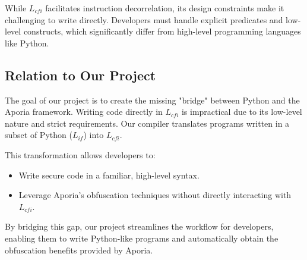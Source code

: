 While $L_{cfi}$ facilitates instruction decorrelation, its design constraints make it challenging to write directly. Developers must handle explicit predicates and low-level constructs, which significantly differ from high-level programming languages like Python.

\subsection{Relation to Our Project}
The goal of our project is to create the missing "bridge" between Python and the Aporia framework. Writing code directly in $L_{cfi}$ is impractical due to its low-level nature and strict requirements. Our compiler translates programs written in a subset of Python ($L_{if}$) into $L_{cfi}$. 

This transformation allows developers to:
\begin{itemize}
    \item Write secure code in a familiar, high-level syntax.
    \item Leverage Aporia’s obfuscation techniques without directly interacting with $L_{cfi}$.
\end{itemize}

By bridging this gap, our project streamlines the workflow for developers, enabling them to write Python-like programs and automatically obtain the obfuscation benefits provided by Aporia.


